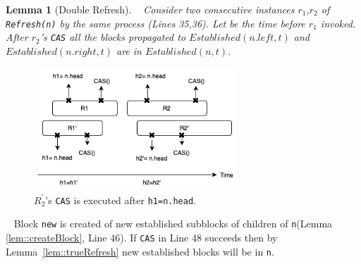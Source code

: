 \documentclass[10pt]{article}
\renewcommand{\tt}[1]{\texttt{#1}}
\newtheorem{lemma}[theorem]{Lemma}
\theoremstyle{definition}
\begin{document}
\begin{lemma}[Double Refresh] \label{doubleRefresh}
  Consider two consecutive instances $r_1$,$r_2$ of \tt{Refresh(n)} by the same process (Lines 35,36). Let be the time before $r_1$ invoked. After $r_2$'s \tt{CAS} all the blocks propagated to $Established(n.left, t)$ and $Established(n.right, t)$ are in $Established(n, t)$.
\end{lemma}
%  
%

\begin{figure}[hbt]
  \center\includegraphics[width=3in]{pics/doublyrefresh.drawio.png}
  \caption{$R_2^\prime$'s \tt{CAS} is executed after \tt{h1=n.head}.}
\end{figure}



  Block \tt{new} is created of new established subblocks of children of \tt{n}(Lemma \ref{lem::createBlock}, Line 46). If \tt{CAS} in Line 48 succeeds then by Lemma~\ref{lem::trueRefresh} new established blocks will be in \tt{n}.
  
\end{document}
